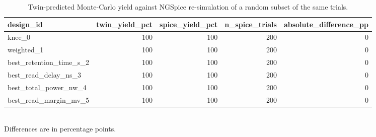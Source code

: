 \begin{table}[!t]
\centering
\caption{Twin-predicted Monte-Carlo yield against NGSpice re-simulation of a random subset of the same trials.}
\label{tab:robustness_spice_yield_check_main}
\footnotesize
\begin{tabular}{lrrrr}
\toprule
design\_id & twin\_yield\_pct & spice\_yield\_pct & n\_spice\_trials & absolute\_difference\_pp \\
\midrule
knee\_0 & 100 & 100 & 200 & 0 \\
weighted\_1 & 100 & 100 & 200 & 0 \\
best\_retention\_time\_s\_2 & 100 & 100 & 200 & 0 \\
best\_read\_delay\_ns\_3 & 100 & 100 & 200 & 0 \\
best\_total\_power\_nw\_4 & 100 & 100 & 200 & 0 \\
best\_read\_margin\_mv\_5 & 100 & 100 & 200 & 0 \\
\bottomrule
\end{tabular}
\\[2pt] \footnotesize Differences are in percentage points.
\end{table}

